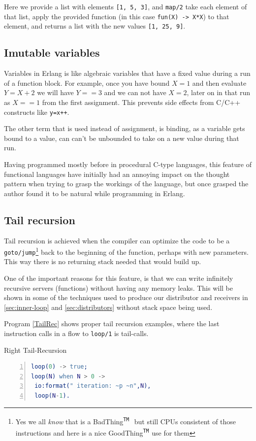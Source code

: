 \documentclass[a4paper,11pt]{report}
\newcommand{\trademark}{\textsuperscript{\texttt{TM}\ }}
\newcommand{\Bad}{BadThing\trademark}
\newcommand{\Good}{GoodThing\trademark}
\begin{document}
Here we provide a list with elements \texttt{[1, 5, 3]}, and
\texttt{map/2} take each element of that list, apply the provided
function (in this case \texttt{fun(X) -> X*X}) to that element, and
returns a list with the new values \texttt{[1, 25, 9]}.

\subsection{Imutable variables}
\label{sec:imVar}
Variables in Erlang is like algebraic variables that have a fixed
value during a run of a function block. For example, once you have
bound $X=1$ and then evaluate $Y=X+2$ we will have $Y==3$ and we can
not have $X=2$,
later on in that run as $X==1$ from the first assignment. This
prevents side effects from C/C++ constructs like \texttt{y=x++}.

The other term that is used instead of assignment, is binding, as a
variable gets bound to a value, can can't be unbounded to take on a
new value during that run.


Having programmed mostly before in procedural C-type languages, this
feature of functional languages have initially had an annoying impact on
the thought pattern when trying to grasp the workings of the language,
but once grasped the author found it to be natural while programming
in Erlang.


\subsection{Tail recursion}
\label{sec:tailrec}
Tail recursion is achieved when the compiler can optimize the code to
be a \texttt{goto/jump}\footnote{Yes we all \emph{know} that is a \Bad
  but still CPUs consistent of those instructions and here is a nice
  \Good use for them} back to the beginning of the function, perhaps
with new parameters. This way there is no returning stack needed that
would build up.

 One of the important reasons for this feature, is that we can write
infinitely recursive servers (functions) without having any memory
leaks. This will be shown in some of the techniques used to produce
our distributor and receivers in \ref{sec:inner-loop} and
\ref{sec:distributors} without stack space being used.


 Program \ref{TailRec} shows proper tail recursion examples, where the last
instruction calls in a flow to \texttt{loop/1} is tail-calls.
\begin{Program}[H]
\caption{Right Tail-Recursion}
\label{TailRec}
\begin{lstlisting}[language=erlang,numbers=left]
loop(0) -> true;
loop(N) when N > 0 -> 
 io:format(" iteration: ~p ~n",N),
 loop(N-1).
\end{lstlisting}
\end{Program}
\end{document}
